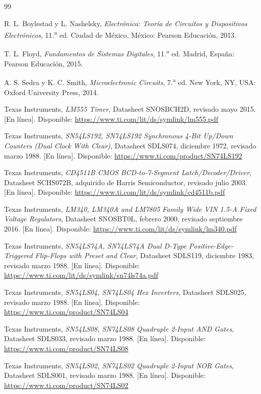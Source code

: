 \documentclass[10pt,onecolumn]{IEEEtran}
\begin{document}
\begin{thebibliography}{99}

 R. L. Boylestad y L. Nashelsky, \emph{Electrónica: Teoría de Circuitos y Dispositivos Electrónicos}, 11.\textsuperscript{a} ed. Ciudad de México, México: Pearson Educación, 2013.

 T. L. Floyd, \emph{Fundamentos de Sistemas Digitales}, 11.\textsuperscript{a} ed. Madrid, España: Pearson Educación, 2015.

 A. S. Sedra y K. C. Smith, \emph{Microelectronic Circuits}, 7.\textsuperscript{a} ed. New York, NY, USA: Oxford University Press, 2014.

 Texas Instruments, \emph{LM555 Timer}, Datasheet SNOSBCH2D, revisado mayo 2015. [En línea]. Disponible: \url{https://www.ti.com/lit/ds/symlink/lm555.pdf}

 Texas Instruments, \emph{SN54LS192, SN74LS192 Synchronous 4-Bit Up/Down Counters (Dual Clock With Clear)}, Datasheet SDLS074, diciembre 1972, revisado marzo 1988. [En línea]. Disponible: \url{https://www.ti.com/product/SN74LS192}

 Texas Instruments, \emph{CD4511B CMOS BCD-to-7-Segment Latch/Decoder/Driver}, Datasheet SCHS072B, adquirido de Harris Semiconductor, revisado julio 2003. [En línea]. Disponible: \url{https://www.ti.com/lit/ds/symlink/cd4511b.pdf}

 Texas Instruments, \emph{LM340, LM340A and LM7805 Family Wide VIN 1.5-A Fixed Voltage Regulators}, Datasheet SNOSBT0L, febrero 2000, revisado septiembre 2016. [En línea]. Disponible: \url{https://www.ti.com/lit/ds/symlink/lm340.pdf}

 Texas Instruments, \emph{SN54LS74A, SN74LS74A Dual D-Type Positive-Edge-Triggered Flip-Flops with Preset and Clear}, Datasheet SDLS119, diciembre 1983, revisado marzo 1988. [En línea]. Disponible: \url{https://www.ti.com/lit/ds/symlink/sn74ls74a.pdf}

 Texas Instruments, \emph{SN54LS04, SN74LS04 Hex Inverters}, Datasheet SDLS025, revisado marzo 1988. [En línea]. Disponible: \url{https://www.ti.com/product/SN74LS04}

 Texas Instruments, \emph{SN54LS08, SN74LS08 Quadruple 2-Input AND Gates}, Datasheet SDLS033, revisado marzo 1988. [En línea]. Disponible: \url{https://www.ti.com/product/SN74LS08}

 Texas Instruments, \emph{SN54LS02, SN74LS02 Quadruple 2-Input NOR Gates}, Datasheet SDLS001, revisado marzo 1988. [En línea]. Disponible: \url{https://www.ti.com/product/SN74LS02}


\end{thebibliography}
\end{document}
